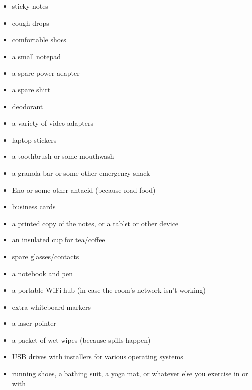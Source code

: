 \begin{itemize}
\item
  sticky notes
\item
  cough drops
\item
  comfortable shoes
\item
  a small notepad
\item
  a spare power adapter
\item
  a spare shirt
\item
  deodorant
\item
  a variety of video adapters
\item
  laptop stickers
\item
  a toothbrush or some mouthwash
\item
  a granola bar or some other emergency snack
\item
  Eno or some other antacid (because road food)
\item
  business cards
\item
  a printed copy of the notes, or a tablet or other device
\item
  an insulated cup for tea/coffee
\item
  spare glasses/contacts
\item
  a notebook and pen
\item
  a portable WiFi hub (in case the room's network isn't working)
\item
  extra whiteboard markers
\item
  a laser pointer
\item
  a packet of wet wipes (because spills happen)
\item
  USB drives with installers for various operating systems
\item
  running shoes, a bathing suit, a yoga mat, or whatever else you
  exercise in or with
\end{itemize}
